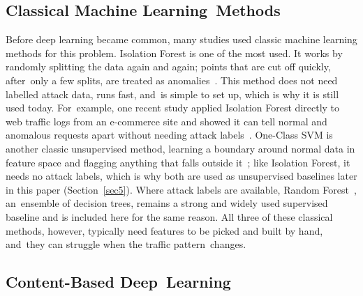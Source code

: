 \documentclass[futureinternet,article,accept,moreauthors]{Definitions/mdpi}
\begin{document}
\subsection{Classical Machine Learning~Methods}

Before deep learning became common, many studies used classic machine learning methods for this problem. Isolation Forest is one of the most used. It works by randomly splitting the data again and again; points that are cut off quickly, after~only a few splits, are treated as anomalies~\cite{liu2008}. This method does not need labelled attack data, runs fast, and~is simple to set up, which is why it is still used today. For~example, one recent study applied Isolation Forest directly to web traffic logs from an e-commerce site and showed it can tell normal and anomalous requests apart without needing attack labels~\cite{chua2024}. One-Class SVM is another classic unsupervised method, learning a boundary around normal data in feature space and flagging anything that falls outside it~\cite{scholkopf2001}; like Isolation Forest, it needs no attack labels, which is why both are used as unsupervised baselines later in this paper (Section~\ref{sec5}). Where attack labels are available, Random Forest~\cite{breiman2001}, an~ensemble of decision trees, remains a strong and widely used supervised baseline and is included here for the same reason. All three of these classical methods, however, typically need features to be picked and built by hand, and~they can struggle when the traffic pattern~changes.

\subsection{Content-Based Deep~Learning}
\end{document}

